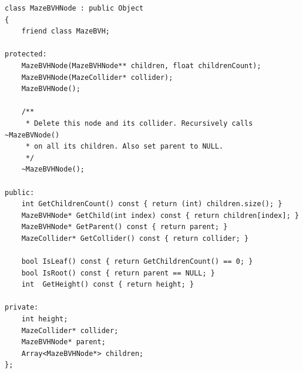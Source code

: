\lstCpp
\begin{lstlisting}[caption=The \texttt{MazeBVHNode} class]
class MazeBVHNode : public Object
{
    friend class MazeBVH;
    
protected:
    MazeBVHNode(MazeBVHNode** children, float childrenCount);
    MazeBVHNode(MazeCollider* collider);
    MazeBVHNode();
    
    /**
     * Delete this node and its collider. Recursively calls ~MazeBVNode()
     * on all its children. Also set parent to NULL.
     */
    ~MazeBVHNode();
    
public:
    int GetChildrenCount() const { return (int) children.size(); }
    MazeBVHNode* GetChild(int index) const { return children[index]; }
    MazeBVHNode* GetParent() const { return parent; }
    MazeCollider* GetCollider() const { return collider; }
    
    bool IsLeaf() const { return GetChildrenCount() == 0; }
    bool IsRoot() const { return parent == NULL; }
    int  GetHeight() const { return height; }
    
private:
    int height;
    MazeCollider* collider;
    MazeBVHNode* parent;
    Array<MazeBVHNode*> children;
};
\end{lstlisting}

